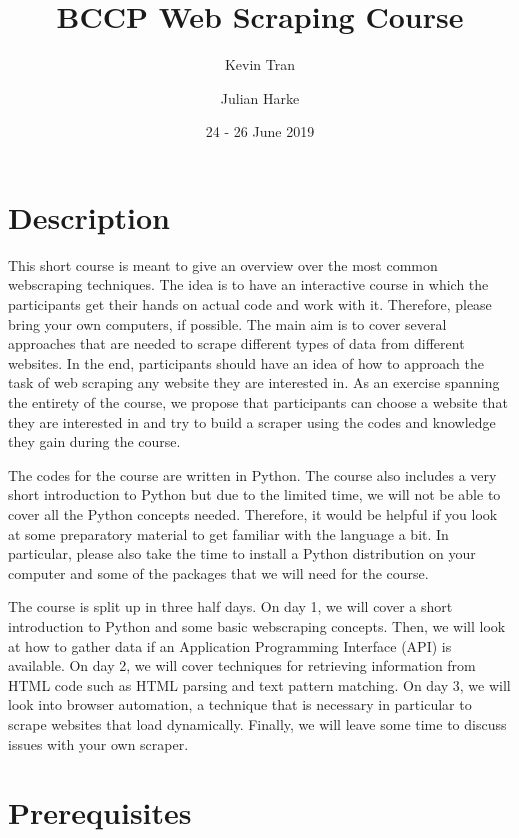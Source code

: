 \documentclass[a4paper]{article}
\begin{document}
\title{BCCP Web Scraping Course}
\author{Kevin Tran \and Julian Harke}
\date{24 - 26 June 2019}
\maketitle{}

\section{Description}

This short course is meant to give an overview over the most common webscraping techniques. The idea is to have an interactive course in which the participants get their hands on actual code and work with it. Therefore, please bring your own computers, if possible. The main aim is to cover several approaches that are needed to scrape different types of data from different websites. In the end, participants should have an idea of how to approach the task of web scraping any website they are interested in.
As an exercise spanning the entirety of the course, we propose that participants can choose a website that they are interested in and try to build a scraper using the codes and knowledge they gain during the course.

The codes for the course are written in Python. The course also includes a very short introduction to Python but due to the limited time, we will not be able to cover all the Python concepts needed. Therefore, it would be helpful if you look at some preparatory material to get familiar with the language a bit. In particular, please also take the time to install a Python distribution on your computer and some of the packages that we will need for the course.

The course is split up in three half days. On day 1, we will cover a short introduction to Python and some basic webscraping concepts. Then, we will look at how to gather data if an Application Programming Interface (API) is available. On day 2, we will cover techniques for retrieving information from HTML code such as HTML parsing and text pattern matching. On day 3, we will look into browser automation, a technique that is necessary in particular to scrape websites that load dynamically. Finally, we will leave some time to discuss issues with your own scraper.

\section{Prerequisites}
\end{document}
